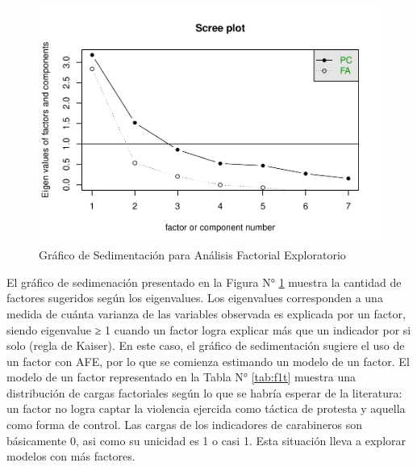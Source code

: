 \documentclass[12pt,twoside]{templates/facsothesis}
\begin{document}
\begin{figure}[!ht]

{\centering \includegraphics[width=1\linewidth,]{tesis_files/figure-latex/scree-1} 

}

\caption{Gráfico de Sedimentación para Análisis Factorial Exploratorio}\label{fig:scree}
\end{figure}

El gráfico de sedimenación presentado en la Figura N° \ref{fig:scree} muestra la cantidad de factores sugeridos según los eigenvalues. Los eigenvalues corresponden a una medida de cuánta varianza de las variables observada es explicada por un factor, siendo eigenvalue ≥ 1 cuando un factor logra explicar más que un indicador por si solo (regla de Kaiser). En este caso, el gráfico de sedimentación sugiere el uso de un factor con AFE, por lo que se comienza estimando un modelo de un factor. El modelo de un factor representado en la Tabla N° \ref{tab:f1t} muestra una distribución de cargas factoriales según lo que se habría esperar de la literatura: un factor no logra captar la violencia ejercida como táctica de protesta y aquella como forma de control. Las cargas de los indicadores de carabineros son básicamente 0, asi como su unicidad es 1 o casi 1. Esta situación lleva a explorar modelos con más factores.
\end{document}
